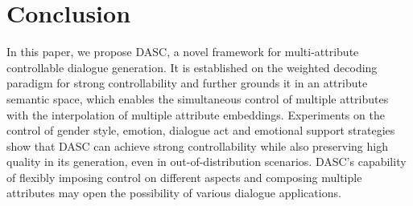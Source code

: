 \section{Conclusion}

In this paper, we propose DASC, a novel framework for multi-attribute controllable dialogue generation. It is established on the weighted decoding paradigm for strong controllability and further grounds it in an attribute semantic space, which enables the simultaneous control of multiple attributes with the interpolation of multiple attribute embeddings. Experiments on the control of gender style, emotion, dialogue act and emotional support strategies show that DASC can achieve strong controllability while also preserving high quality in its generation, even in out-of-distribution scenarios. DASC's capability of flexibly imposing control on different aspects and composing multiple attributes may open the possibility of various dialogue applications.   
